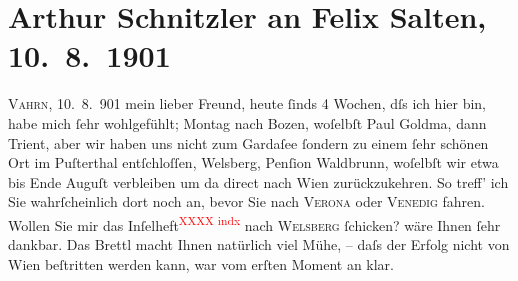                \section[Arthur Schnitzler an Felix Salten, 10. 8. 1901]{ Arthur Schnitzler an Felix Salten, 10. 8. 1901}\nopagebreak{}\rehead{ }\begin{ledgroupsized}[t]{13cm}\normalsize\beginnumbering \toendnotes[C]{\smallbreak\pagebreak[2]} 
\toendnotes[C]{\smallbreak}\pstart
           \raggedleft{}{\pb}\textsc{Vahrn}, 10. 8. 901\pend
           \pstart
           mein lieber Freund, heute ſinds 4 Wochen, dſs ich hier bin, habe mich ſehr wohlgefühlt;
                  Montag nach Bozen, woſelbſt Paul Goldma{\geminationn}, dann Trient, aber wir haben uns nicht zum
                  Gardaſee ſondern zu einem ſehr schönen Ort
               im Puſterthal entſchloſſen, Welsberg, Penſion {\pb}Waldbrunn, woſelbſt wir etwa bis
                  Ende Auguſt verbleiben um da{\geminationn} direct
               nach Wien zurückzukehren. So treff’ ich Sie
               wahrſcheinlich dort noch an, bevor Sie nach \textsc{Verona} oder \textsc{Venedig} fahren. Wollen Sie mir das Inſelheft\textcolor{red}{\textsuperscript{XXXX indx}} nach \textsc{Welsberg} ſchicken? wäre Ihnen ſehr dankbar. Das Brettl macht Ihnen natürlich viel Mühe, {\pb}– daſs der Erfolg nicht von Wien beſtritten werden kann, war vom erſten Moment an klar.

\end{ledgroupsized}
